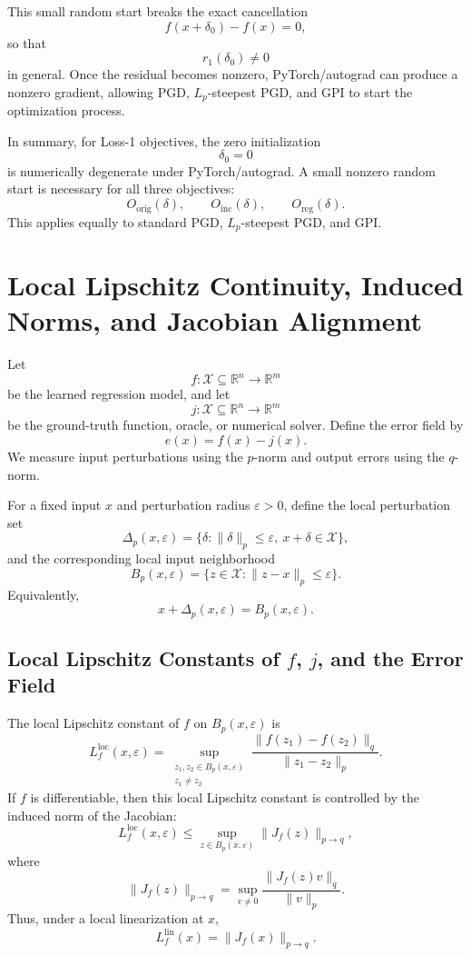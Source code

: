 \documentclass{article}
\begin{document}
This small random start breaks the exact cancellation
\[
f(x+\delta_0)-f(x)=0,
\]
so that
\[
r_1(\delta_0)\neq 0
\]
in general. Once the residual becomes nonzero, PyTorch/autograd can produce a nonzero gradient, allowing PGD, \(L_p\)-steepest PGD, and GPI to start the optimization process.

In summary, for Loss-1 objectives, the zero initialization
\[
\delta_0=0
\]
is numerically degenerate under PyTorch/autograd. A small nonzero random start is necessary for all three objectives:
\[
O_{\mathrm{orig}}(\delta),
\qquad
O_{\mathrm{inc}}(\delta),
\qquad
O_{\mathrm{reg}}(\delta).
\]
This applies equally to standard PGD, \(L_p\)-steepest PGD, and GPI.

\section{Local Lipschitz Continuity, Induced Norms, and Jacobian Alignment}

Let
\[
f:\mathcal X\subseteq \mathbb R^n\to \mathbb R^m
\]
be the learned regression model, and let
\[
j:\mathcal X\subseteq \mathbb R^n\to \mathbb R^m
\]
be the ground-truth function, oracle, or numerical solver. Define the error field by
\[
e(x)=f(x)-j(x).
\]
We measure input perturbations using the \(p\)-norm and output errors using the \(q\)-norm.

For a fixed input \(x\) and perturbation radius \(\varepsilon>0\), define the local perturbation set
\[
\Delta_p(x,\varepsilon)
=
\{\delta:\|\delta\|_p\le \varepsilon,\ x+\delta\in \mathcal X\},
\]
and the corresponding local input neighborhood
\[
B_p(x,\varepsilon)
=
\{z\in\mathcal X:\|z-x\|_p\le \varepsilon\}.
\]
Equivalently,
\[
x+\Delta_p(x,\varepsilon)=B_p(x,\varepsilon).
\]

\subsection{Local Lipschitz Constants of \(f\), \(j\), and the Error Field}

The local Lipschitz constant of \(f\) on \(B_p(x,\varepsilon)\) is
\[
L_f^{\mathrm{loc}}(x,\varepsilon)
=
\sup_{\substack{z_1,z_2\in B_p(x,\varepsilon)\\ z_1\neq z_2}}
\frac{
\|f(z_1)-f(z_2)\|_q
}{
\|z_1-z_2\|_p
}.
\]
If \(f\) is differentiable, then this local Lipschitz constant is controlled by the induced norm of the Jacobian:
\[
L_f^{\mathrm{loc}}(x,\varepsilon)
\le
\sup_{z\in B_p(x,\varepsilon)}
\|J_f(z)\|_{p\to q},
\]
where
\[
\|J_f(z)\|_{p\to q}
=
\sup_{v\neq 0}
\frac{\|J_f(z)v\|_q}{\|v\|_p}.
\]
Thus, under a local linearization at \(x\),
\[
L_f^{\mathrm{lin}}(x)
=
\|J_f(x)\|_{p\to q}.
\]
\end{document}
